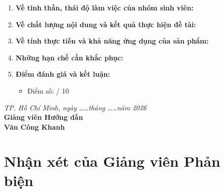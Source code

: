 \documentclass[12pt, a4paper]{report}
\begin{document}
\begin{enumerate}[label=\textbf{\arabic*.}, leftmargin=*]
    \item \textbf{Về tinh thần, thái độ làm việc của nhóm sinh viên:}
    \vspace{0.8cm}
    \dotfill
    \vspace{0.8cm}
    \dotfill
    
    \item \textbf{Về chất lượng nội dung và kết quả thực hiện đề tài:}
    \vspace{0.8cm}
    \dotfill
    \vspace{0.8cm}
    \dotfill
    
    \item \textbf{Về tính thực tiễn và khả năng ứng dụng của sản phẩm:}
    \vspace{0.8cm}
    \dotfill
    \vspace{0.8cm}
    \dotfill
    
    \item \textbf{Những hạn chế cần khắc phục:}
    \vspace{0.8cm}
    \dotfill
    
    \item \textbf{Điểm đánh giá và kết luận:}
    \vspace{0.6cm}
    \dotfill
    \begin{itemize}[noitemsep]
        \item Điểm số: \dotfill / 10
    \end{itemize}
\end{enumerate}

\vspace{1cm}
\begin{flushright}
    \textit{TP. Hồ Chí Minh, ngày \dots\dots tháng \dots\dots năm 2026} \\[5pt]
    \textbf{Giảng viên Hướng dẫn} \\[40pt]
    \textbf{Văn Công Khanh}
\end{flushright}


\chapter*{Nhận xét của Giảng viên Phản biện}
\label{chap:nhanxet_gvpb}
\end{document}
